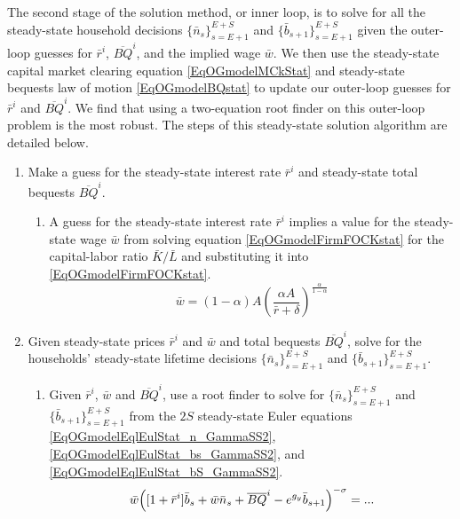 \documentclass[letterpaper,12pt]{article}
\theoremstyle{definition}
\begin{document}
    The second stage of the solution method, or inner loop, is to solve for all the steady-state household decisions $\{\bar{n}_s\}_{s=E+1}^{E+S}$ and $\{\bar{b}_{s+1}\}_{s=E+1}^{E+S}$ given the outer-loop guesses for $\bar{r}^i$, $\overline{BQ}^i$, and the implied wage $\bar{w}$. We then use the steady-state capital market clearing equation \eqref{EqOGmodelMCkStat} and steady-state bequests law of motion \eqref{EqOGmodelBQstat} to update our outer-loop guesses for $\bar{r}^i$ and $\overline{BQ}^i$. We find that using a two-equation root finder on this outer-loop problem is the most robust. The steps of this steady-state solution algorithm are detailed below.

    \begin{enumerate}
      \item Make a guess for the steady-state interest rate $\bar{r}^i$ and steady-state total bequests $\overline{BQ}^i$.
        \begin{enumerate}
          \item A guess for the steady-state interest rate $\bar{r}^i$ implies a value for the steady-state wage $\bar{w}$ from solving equation \eqref{EqOGmodelFirmFOCKstat} for the capital-labor ratio $\bar{K}/\bar{L}$ and substituting it into \eqref{EqOGmodelFirmFOCKstat}.
          \begin{equation}\label{EqOGmodel_wfuncr_SS}
            \bar{w} = (1-\alpha)A\left(\frac{\alpha A}{\bar{r} + \delta}\right)^{\frac{\alpha}{1-\alpha}}
          \end{equation}
        \end{enumerate}
      \item Given steady-state prices $\bar{r}^i$ and $\bar{w}$ and total bequests $\overline{BQ}^i$, solve for the households' steady-state lifetime decisions $\{\bar{n}_s\}_{s=E+1}^{E+S}$ and $\{\bar{b}_{s+1}\}_{s=E+1}^{E+S}$.
        \begin{enumerate}
          \item Given $\bar{r}^i$, $\bar{w}$ and $\overline{BQ}^i$, use a root finder to solve for $\{\bar{n}_s\}_{s=E+1}^{E+S}$ and $\{\bar{b}_{s+1}\}_{s=E+1}^{E+S}$ from the $2S$ steady-state Euler equations \eqref{EqOGmodelEqlEulStat_n_GammaSS2}, \eqref{EqOGmodelEqlEulStat_bs_GammaSS2}, and \eqref{EqOGmodelEqlEulStat_bS_GammaSS2}.
          \begin{equation}\label{EqOGmodelEqlEulStat_n_GammaSS2}
            \begin{split}
              &\bar{w}\Bigl([1 + \bar{r}^i]\bar{b}_{s} + \bar{w}\bar{n}_{s} + \overline{BQ}^i - e^{g_y}\bar{b}_{s+1}\Bigr)^{-\sigma} = ...  \\

\end{split}
\end{equation}
\end{enumerate}
\end{enumerate}
\end{document}
